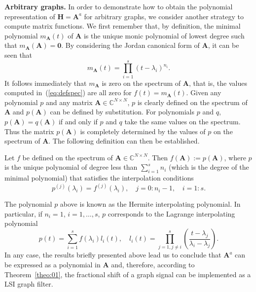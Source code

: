 \noindent\textbf{Arbitrary graphs.} In order to demonstrate how to obtain the polynomial representation of $\mathbf{H}=\mathbf{A}^a$ for arbitrary graphs, we consider another strategy to compute matrix functions. We first remember that, by definition, the minimal polynomial $m_{\mathbf{A}}(t)$ of $\mathbf{A}$ is the unique monic polynomial of lowest degree such that $m_{\mathbf{A}}(\mathbf{A})=\mathbf{0}$. By considering the Jordan canonical form of $\mathbf{A}$, it can be seen that
\begin{equation}
m_{\mathbf{A}}(t)=\prod_{i=1}^s (t-\lambda_i)^{n_i}.
\end{equation}
It follows immediately that $m_{\mathbf{A}}$ is zero on the spectrum of $\mathbf{A}$, that is, the values computed in~(\ref{eq:defspec}) are all zero for $f(t)=m_{\mathbf{A}}(t)$. Given any polynomial $p$ and any matrix $\mathbf{A}\in\mathbb{C}^{N\times N}$, $p$ is clearly defined on the spectrum of $\mathbf{A}$ and $p(\mathbf{A})$ can be defined by substitution. For polynomials $p$ and $q$, $p(\mathbf{A})=q(\mathbf{A})$ if and only if $p$ and $q$ take the same values on the spectrum. Thus the matrix $p(\mathbf{A})$ is completely determined by the values of $p$ on the spectrum of $\mathbf{A}$. The following definition can then be established.
\vspace{0.2cm}
\begin{definition}\label{def:jc02}
Let $f$ be defined on the spectrum of $\mathbf{A}\in\mathbb{C}^{N\times N}$. Then $f(\mathbf{A}):=p(\mathbf{A})$, where $p$ is the unique polynomial of degree less than $\sum_{i=1}^s n_i$ (which is the degree of the minimal polynomial) that satisfies the interpolation conditions
\begin{equation}
    p^{(j)}(\lambda_i)=f^{(j)}(\lambda_i),\quad j=0:n_i-1,\quad i=1:s.
\end{equation}
\end{definition}

The polynomial $p$ above is known as the Hermite interpolating polynomial. In particular, if $n_i=1$, $i=1,\ldots,s$, $p$ corresponds to the Lagrange interpolating polynomial
\begin{equation}
    p(t)=\sum_{i=1}^s f(\lambda_i)l_i(t),\quad l_i(t)=\prod_{j=1,j\neq i}^s \left(\frac{t-\lambda_j}{\lambda_i-\lambda_j}\right).
\end{equation}
In any case, the results briefly presented above lead us to conclude that $\mathbf{A}^a$ can be expressed as a polynomial in $\mathbf{A}$ and, therefore, according to Theorem~\ref{theo:01}, the fractional shift of a graph signal can be implemented as a LSI graph filter.

